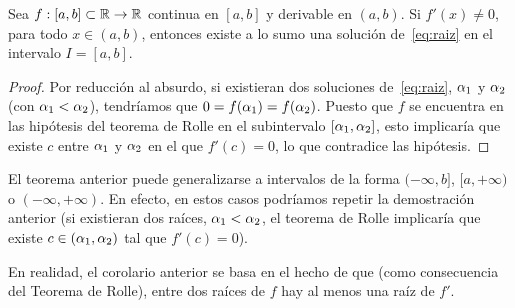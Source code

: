 

\begin{corollary}
  \label{cor:tema1:exist+unic}
  Sea $f:[a,b]\subset \operatorname{{\mathbb R}}\to\operatorname{{\mathbb R}}$ continua en $[a, b]$ y derivable
  en $(a, b)$. Si $f'(x)\ne 0$, para todo $x\in (a, b)$, entonces
  existe a lo sumo una solución de~\eqref{eq:raiz} en el intervalo
  $I=[a,b]$.
\end{corollary}

\begin{proof}
  Por reducción al absurdo, si existieran dos soluciones
  de~\eqref{eq:raiz}, $\alpha_1$ y $\alpha_2$ (con $\alpha_1<\alpha_2$),
  tendríamos que $0=f(\alpha_1)=f(\alpha_2)$. Puesto que $f$ se
  encuentra en las hipótesis del teorema de Rolle en el subintervalo
  $[\alpha_1,\alpha_2]$, esto implicaría que existe $c$ entre $\alpha_1$
  y $\alpha_2$ en el que $f'(c)=0$, lo que contradice las hipótesis.
\end{proof}

\begin{remark}
  \label{rk:tema1:exist+unic}

  El teorema anterior puede generalizarse a intervalos de la forma
  $(-\infty,b]$, $[a,+\infty)$ o $(-\infty,+\infty)$. En efecto, en
  estos casos podríamos repetir la demostración anterior (si
  existieran dos raíces, $\alpha_1<\alpha_2$, el teorema de Rolle
  implicaría que existe $c\in (\alpha_1,\alpha_2)$ tal que $f'(c)=0$).
\end{remark}

En realidad, el corolario anterior se basa en el hecho de que (como
consecuencia del Teorema de Rolle), entre dos raíces de $f$ hay al
menos una raíz de $f'$.

